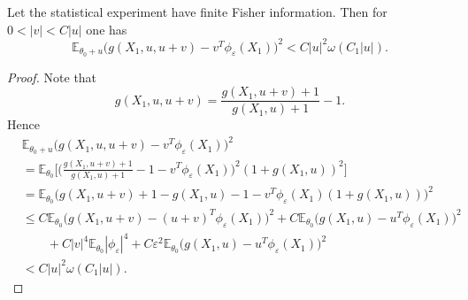 \documentclass[10pt,a4paper]{amsart}
\begin{document}
\begin{lemma}\label{lem:4.1}
Let the statistical experiment have finite Fisher information. Then for $0<|v|<C|u|$ one has
\begin{equation}
\mathbb{E}_{\theta_0+u}\bigl(g(X_1,u,u+v)-v^T\phi_\varepsilon(X_1)\bigr)^2<C|u|^2\omega(C_1|u|).
\end{equation}
\end{lemma}

\begin{proof}
Note that
\[
g(X_1,u,u+v)=\frac{g(X_1,u+v)+1}{g(X_1,u)+1}-1.
\]
Hence
\begin{align*}
&\mathbb{E}_{\theta_0+u}\bigl(g(X_1,u,u+v)-v^T\phi_\varepsilon(X_1)\bigr)^2\\
&=\mathbb{E}_{\theta_0}\Biggl[\Biggl(\frac{g(X_1,u+v)+1}{g(X_1,u)+1}-1-v^T\phi_\varepsilon(X_1)\Biggr)^2(1+g(X_1,u))^2\Biggr]\\
&=\mathbb{E}_{\theta_0}\bigl(g(X_1,u+v)+1-g(X_1,u)-1-v^T\phi_\varepsilon(X_1)(1+g(X_1,u))\bigr)^2\\
&\le C\mathbb{E}_{\theta_0}\bigl(g(X_1,u+v)-(u+v)^T\phi_\varepsilon(X_1)\bigr)^2+C\mathbb{E}_{\theta_0}\bigl(g(X_1,u)-u^T\phi_\varepsilon(X_1)\bigr)^2\\
&\qquad+C|v|^4\mathbb{E}_{\theta_0}|\phi_\varepsilon|^4+C\varepsilon^2\mathbb{E}_{\theta_0}\bigl(g(X_1,u)-u^T\phi_\varepsilon(X_1)\bigr)^2\\
&<C|u|^2\omega(C_1|u|).
\end{align*}
\end{proof}
\end{document}
